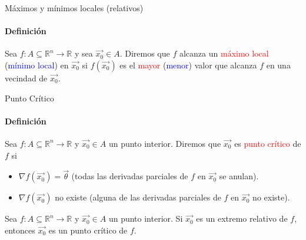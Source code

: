 \documentclass{plantillaPPT}
\begin{document}
\primeraDiapo

\begin{frame}{Máximos y mínimos locales (relativos)}
\framesubtitle{Definición}

\begin{definicion}
    Sea $f:A\subseteq\mathbb{R}^n\to\mathbb{R}$ y sea $\vec{x_0}\in A$. Diremos que $f$ alcanza un \textcolor{red}{máximo local} (\textcolor{blue}{mínimo local}) en $\vec{x_0}$ si $f(\vec{x_0})$ es el \textcolor{red}{mayor} (\textcolor{blue}{menor}) valor que alcanza $f$ en una vecindad de $\vec{x_0}$.
\end{definicion}
\end{frame}

\begin{frame}{Punto Crítico}
\framesubtitle{Definición}

\begin{definicion}
    Sea $f:A\subseteq\mathbb{R}^n\to\mathbb{R}$ y $\vec{x_0}\in A$ un punto interior. Diremos que $\vec{x_0}$ es \textcolor{red}{punto crítico} de $f$ si
    \begin{itemize}
        \item $\nabla f(\vec{x_0}) = \vec{\theta}$ (todas las derivadas parciales de $f$ en $\vec{x_0}$ se anulan).
        \item $\nabla f(\vec{x_0})$ no existe (alguna de las derivadas parciales de $f$ en $\vec{x_0}$ no existe).
    \end{itemize}
\end{definicion}

\begin{teorema}
    Sea $f:A\subseteq\mathbb{R}^n\to\mathbb{R}$ y $\vec{x_0}\in A$ un punto interior. Si $\vec{x_0}$ es un extremo relativo de $f$, entonces $\vec{x_0}$ es un punto crítico de $f$.
\end{teorema}    
\end{frame}
\end{document}
